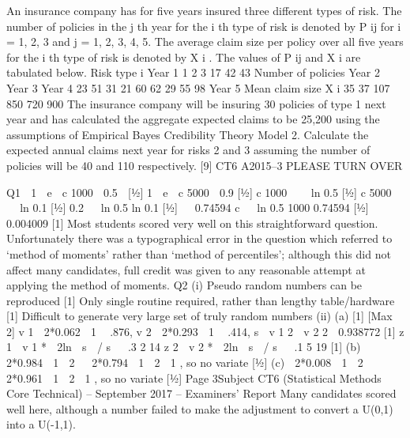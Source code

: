 \documentclass[a4paper,12pt]{article}
\begin{document}
\begin{enumerate}
[2]
[Total 9]
An insurance company has for five years insured three different types of risk. The
number of policies in the j th year for the i th type of risk is denoted by P ij for i = 1, 2, 3
and j = 1, 2, 3, 4, 5. The average claim size per policy over all five years for the i th
type of risk is denoted by X i . The values of P ij and X i are tabulated below.
Risk type i Year 1
1
2
3 17
42
43
Number of policies
Year 2
Year 3
Year 4
23
51
31
21
60
62
29
55
98
Year 5 Mean claim size
X i
35
37
107 850
720
900
The insurance company will be insuring 30 policies of type 1 next year and has
calculated the aggregate expected claims to be 25,200 using the assumptions of
Empirical Bayes Credibility Theory Model 2.
Calculate the expected annual claims next year for risks 2 and 3 assuming the number
of policies will be 40 and 110 respectively.
[9]
CT6 A2015–3
PLEASE TURN OVER

Q1

1  e  c 1000  0.5

[1⁄2]
1  e  c 5000  0.9 [1⁄2]
c 1000    ln 0.5 [1⁄2]
c 5000    ln 0.1 [1⁄2]
0.2  
ln 0.5
ln 0.1
[1⁄2]
  0.74594
c 
 ln 0.5
1000 0.74594
[1⁄2]
 0.004009
[1]
Most students scored very well on this straightforward question.
Unfortunately there was a typographical error in the question which
referred to ‘method of moments’ rather than ‘method of percentiles’;
although this did not affect many candidates, full credit was given to
any reasonable attempt at applying the method of moments.
Q2
(i)
Pseudo random numbers can be reproduced [1]
Only single routine required, rather than lengthy table/hardware [1]
Difficult to generate very large set of truly random numbers
(ii)
(a)
[1]
[Max 2]
v 1  2*0.062  1  .876, v 2  2*0.293  1  .414,
s  v 1 2  v 2 2  0.938772
[1]
z 1  v 1 *  2ln  s  / s   .3 2 14
z 2  v 2 *  2ln  s  / s   .1 5 19 [1]
(b)  2*0.984  1  2   2*0.794  1  2  1 , so no variate [1⁄2]
(c)  2*0.008  1  2   2*0.961  1  2  1 , so no variate [1⁄2]
Page 3Subject CT6 (Statistical Methods Core Technical) – September 2017 – Examiners’ Report
Many candidates scored well here, although a number failed to make
the adjustment to convert a U(0,1) into a U(-1,1).



\end{enumerate}
\end{document}

